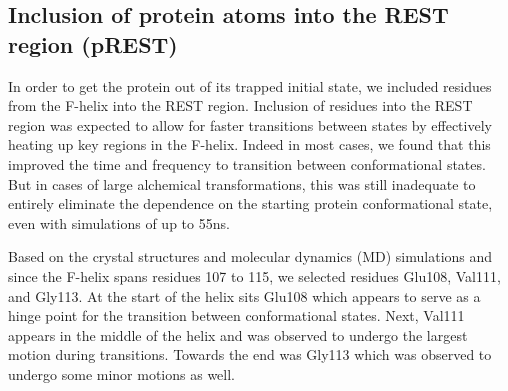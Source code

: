 \documentclass{article}
\begin{document}
      
\subsection*{Inclusion of protein atoms into the REST region (pREST)}
In order to get the protein out of its trapped initial state, we included residues from the F-helix into the REST region.
Inclusion of residues into the REST region was expected to allow for faster transitions between states by effectively heating up key regions in the F-helix.
Indeed in most cases, we found that this improved the time and frequency to transition between conformational states.
But in cases of large alchemical transformations, this was still inadequate to entirely eliminate the dependence on the starting protein conformational state, even with simulations of up to 55ns.

Based on the crystal structures and molecular dynamics (MD) simulations and since the F-helix spans residues 107 to 115, we selected residues Glu108, Val111, and Gly113.
At the start of the helix sits Glu108 which appears to serve as a hinge point for the transition between conformational states. 
Next, Val111 appears in the middle of the helix and was observed to undergo the largest motion during transitions. 
Towards the end was Gly113 which was observed to undergo some minor motions as well.
\end{document}
